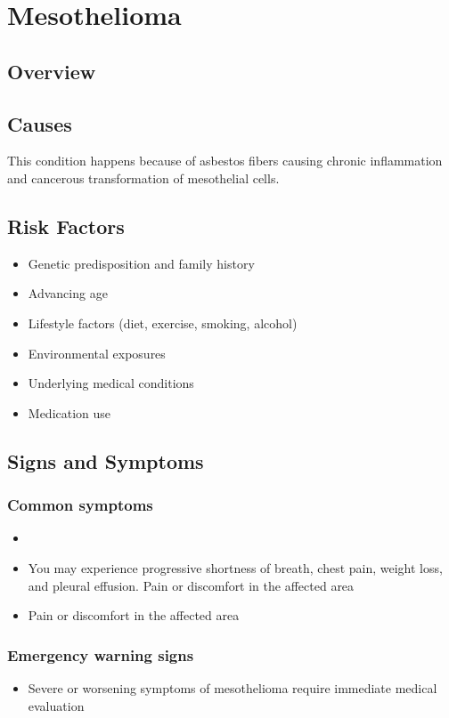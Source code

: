 \chapter{Mesothelioma}
\label{sec:Mesothelioma}

\section{Overview}

\section{Causes}
This condition happens because of asbestos fibers causing chronic inflammation and cancerous transformation of mesothelial cells.     
\section{Risk Factors}

\begin{itemize}[noitemsep]
  \item Genetic predisposition and family history
  \item Advancing age
  \item Lifestyle factors (diet, exercise, smoking, alcohol)
  \item Environmental exposures
  \item Underlying medical conditions
  \item Medication use
\end{itemize}
\section{Signs and Symptoms}

\subsection{Common symptoms}
\begin{itemize}[noitemsep]
  \item \item You may experience progressive shortness of breath, chest pain, weight loss, and pleural effusion. Pain or discomfort in the affected area    \item Pain or discomfort in the affected area
  \end{itemize}

\subsection{Emergency warning signs}
\begin{itemize}[noitemsep]
  \item Severe or worsening symptoms of mesothelioma require immediate medical evaluation
\end{itemize}
